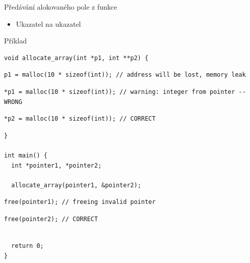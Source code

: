 \begin{frame}[fragile]{Předávání alokovaného pole z funkce}

  \begin{itemize}
    \item Ukazatel na ukazatel
  \end{itemize}

  \pause

  \begin{block}{Příklad}
    \begin{lstlisting}[belowskip=0pt]
void allocate_array(int *p1, int **p2) {
    \end{lstlisting}
    \begin{lstlisting}[aboveskip=0pt,belowskip=0pt]
  p1 = malloc(10 * sizeof(int)); // address will be lost, memory leak
    \end{lstlisting}
    \begin{lstlisting}[aboveskip=0pt,belowskip=0pt]
  *p1 = malloc(10 * sizeof(int)); // warning: integer from pointer -- WRONG
    \end{lstlisting}
    \begin{lstlisting}[aboveskip=0pt,belowskip=0pt]
  *p2 = malloc(10 * sizeof(int)); // CORRECT
    \end{lstlisting}
    \begin{lstlisting}[aboveskip=0pt,belowskip=0pt]
}

int main() {
  int *pointer1, *pointer2;

  allocate_array(pointer1, &pointer2);
    \end{lstlisting}
    \begin{lstlisting}[aboveskip=0pt,belowskip=0pt]
  free(pointer1); // freeing invalid pointer
    \end{lstlisting}
    \begin{lstlisting}[aboveskip=0pt,belowskip=0pt]
  free(pointer2); // CORRECT
    \end{lstlisting}
    \begin{lstlisting}[aboveskip=0pt,belowskip=0pt]

  return 0;
}
    \end{lstlisting}
  \end{block}

\end{frame}

